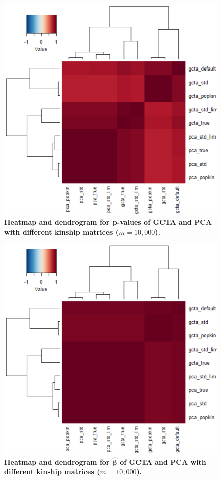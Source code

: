 \documentclass[11pt]{article}
\begin{document}
\begin{figure}[bp!]
  \centering
  \includegraphics[width=6in]{all_pval.pdf}
  \caption{
    {\bf Heatmap and dendrogram for p-values of GCTA and PCA with different kinship matrices ($m=10,000$).}
  }
  \label{fig:all_pval}
\end{figure}

\begin{figure}[bp!]
  \centering
  \includegraphics[width=6in]{all_beta_hat.pdf}
  \caption{
    {\bf Heatmap and dendrogram for $\hat{\mathbf{\beta}}$ of GCTA and PCA with different kinship matrices ($m=10,000$).}
  }
  \label{fig:all_beta_hat}
\end{figure}
\end{document}
